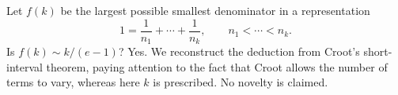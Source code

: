 Let $f(k)$ be the largest possible smallest denominator in a representation
\[
 1=\frac1{n_1}+\cdots+\frac1{n_k},\qquad n_1<\cdots<n_k.
\]
Is $f(k)\sim k/(e-1)$? Yes. We reconstruct the deduction from Croot's short-interval theorem, paying attention to the fact that Croot allows the number of terms to vary, whereas here $k$ is prescribed. No novelty is claimed.
